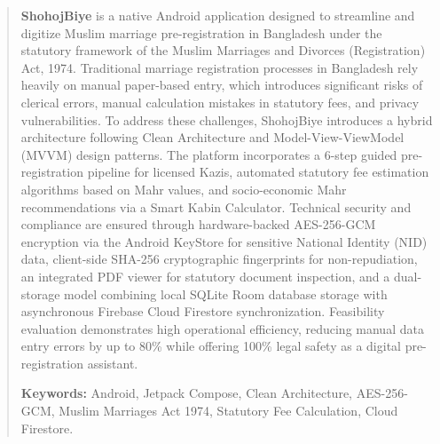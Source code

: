 \documentclass[12pt,a4paper]{article}
\begin{document}
	\clearpage
	\begin{abstract}
		\noindent
		\textbf{ShohojBiye} is a native Android application designed to streamline and digitize Muslim marriage pre-registration in Bangladesh under the statutory framework of the Muslim Marriages and Divorces (Registration) Act, 1974. Traditional marriage registration processes in Bangladesh rely heavily on manual paper-based entry, which introduces significant risks of clerical errors, manual calculation mistakes in statutory fees, and privacy vulnerabilities. To address these challenges, ShohojBiye introduces a hybrid architecture following Clean Architecture and Model-View-ViewModel (MVVM) design patterns. The platform incorporates a 6-step guided pre-registration pipeline for licensed Kazis, automated statutory fee estimation algorithms based on Mahr values, and socio-economic Mahr recommendations via a Smart Kabin Calculator. Technical security and compliance are ensured through hardware-backed AES-256-GCM encryption via the Android KeyStore for sensitive National Identity (NID) data, client-side SHA-256 cryptographic fingerprints for non-repudiation, an integrated PDF viewer for statutory document inspection, and a dual-storage model combining local SQLite Room database storage with asynchronous Firebase Cloud Firestore synchronization. Feasibility evaluation demonstrates high operational efficiency, reducing manual data entry errors by up to 80\% while offering 100\% legal safety as a digital pre-registration assistant.
		
		\vspace{0.5em}
		\noindent \textbf{Keywords:} Android, Jetpack Compose, Clean Architecture, AES-256-GCM, Muslim Marriages Act 1974, Statutory Fee Calculation, Cloud Firestore.
	\end{abstract}
	
	\clearpage
	
	\newpage
	\setcounter{page}{1}
	
	\renewcommand{\contentsname}{Table of Contents}
	\tableofcontents
	\newpage
	
	\listoftables
	
	\listoffigures
	
	\newpage
	\setcounter{page}{1}
	
	\clearpage
	
\end{document}

